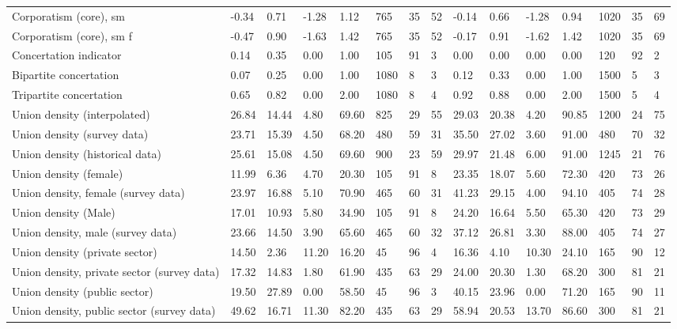 \begin{longtable}{lllllllllllllll}
\addlinespace
Corporatism (core), sm & -0.34 & 0.71 & -1.28 & 1.12 & 765 & 35 & 52 & -0.14 & 0.66 & -1.28 & 0.94 & 1020 & 35 & 69\\
Corporatism (core), sm f & -0.47 & 0.90 & -1.63 & 1.42 & 765 & 35 & 52 & -0.17 & 0.91 & -1.62 & 1.42 & 1020 & 35 & 69\\
Concertation indicator & 0.14 & 0.35 & 0.00 & 1.00 & 105 & 91 & 3 & 0.00 & 0.00 & 0.00 & 0.00 & 120 & 92 & 2\\
Bipartite concertation & 0.07 & 0.25 & 0.00 & 1.00 & 1080 & 8 & 3 & 0.12 & 0.33 & 0.00 & 1.00 & 1500 & 5 & 3\\
Tripartite concertation & 0.65 & 0.82 & 0.00 & 2.00 & 1080 & 8 & 4 & 0.92 & 0.88 & 0.00 & 2.00 & 1500 & 5 & 4\\
\addlinespace
Union density (interpolated) & 26.84 & 14.44 & 4.80 & 69.60 & 825 & 29 & 55 & 29.03 & 20.38 & 4.20 & 90.85 & 1200 & 24 & 75\\
Union density (survey data) & 23.71 & 15.39 & 4.50 & 68.20 & 480 & 59 & 31 & 35.50 & 27.02 & 3.60 & 91.00 & 480 & 70 & 32\\
Union density (historical data) & 25.61 & 15.08 & 4.50 & 69.60 & 900 & 23 & 59 & 29.97 & 21.48 & 6.00 & 91.00 & 1245 & 21 & 76\\
Union density (female) & 11.99 & 6.36 & 4.70 & 20.30 & 105 & 91 & 8 & 23.35 & 18.07 & 5.60 & 72.30 & 420 & 73 & 26\\
Union density, female (survey data) & 23.97 & 16.88 & 5.10 & 70.90 & 465 & 60 & 31 & 41.23 & 29.15 & 4.00 & 94.10 & 405 & 74 & 28\\
\addlinespace
Union density (Male) & 17.01 & 10.93 & 5.80 & 34.90 & 105 & 91 & 8 & 24.20 & 16.64 & 5.50 & 65.30 & 420 & 73 & 29\\
Union density, male (survey data) & 23.66 & 14.50 & 3.90 & 65.60 & 465 & 60 & 32 & 37.12 & 26.81 & 3.30 & 88.00 & 405 & 74 & 27\\
Union density (private sector) & 14.50 & 2.36 & 11.20 & 16.20 & 45 & 96 & 4 & 16.36 & 4.10 & 10.30 & 24.10 & 165 & 90 & 12\\
Union density, private sector (survey data) & 17.32 & 14.83 & 1.80 & 61.90 & 435 & 63 & 29 & 24.00 & 20.30 & 1.30 & 68.20 & 300 & 81 & 21\\
Union density (public sector) & 19.50 & 27.89 & 0.00 & 58.50 & 45 & 96 & 3 & 40.15 & 23.96 & 0.00 & 71.20 & 165 & 90 & 11\\
\addlinespace
Union density, public sector (survey data) & 49.62 & 16.71 & 11.30 & 82.20 & 435 & 63 & 29 & 58.94 & 20.53 & 13.70 & 86.60 & 300 & 81 & 21\\

\end{longtable}
